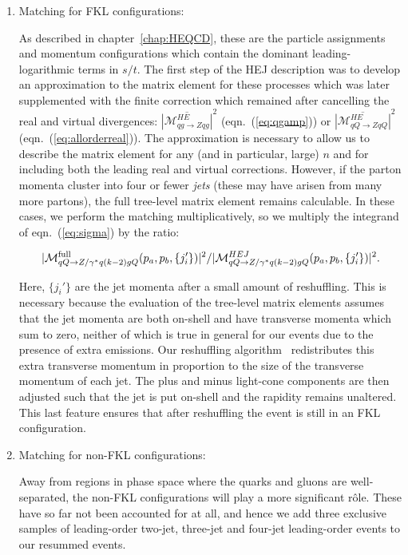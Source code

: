 	\begin{enumerate}
		\item Matching for FKL configurations:

		  As described in chapter~\ref{chap:HEQCD}, these are the particle assignments
		  and momentum configurations which contain the dominant leading-logarithmic
		  terms in $s/t$.  The first step of the HEJ description was to develop an
		  approximation to the matrix element for these processes which was later
		  supplemented with the finite correction which remained after cancelling the
		  real and virtual divergences: $\overline{|\mathcal{M}_{qg\to Zqg}^{HE}|}^2$
		  (eqn.~(\ref{eq:qgamp})) or $\overline{|\mathcal{M}_{qQ\to ZqQ}^{HE}|}^2$
		  (eqn.~(\ref{eq:allorderreal})).  The approximation is necessary to allow us to
		  describe the matrix element for any (and in particular, large) $n$ and for
		  including both the leading real and virtual corrections.  However,
		  if the parton momenta cluster into four or fewer \emph{jets} (these
		  may have arisen from many more partons), the full tree-level matrix element remains
		  calculable.  In these cases, we perform the matching multiplicatively, so we
		  multiply the integrand of eqn.~(\ref{eq:sigma}) by the ratio:

		  \begin{align}
		    |\mathcal{M}^{\rm full}_{qQ\to Z/\gamma^* q(k-2)gQ}(p_a,p_b,\{
		    j_i'\})|^2/|\mathcal{M}^{HEJ}_{qQ\to Z/\gamma^* q(k-2)gQ}(p_a,p_b,\{j_i'\})|^2.
		  \end{align}

		  Here, $\{j_i'\}$ are the jet momenta after a small amount of
		  reshuffling.  This is necessary because the evaluation of the tree-level matrix elements
		  assumes that the jet momenta are both on-shell and have transverse momenta which
		  sum to zero, neither of which is true in general for our events due to the
		  presence of extra emissions.  Our reshuffling algorithm~\cite{Andersen:2011hs} redistributes this
		  extra transverse momentum in proportion to the size of the transverse
		  momentum of each jet.  The plus and minus light-cone components are then adjusted such
		  that the jet is put on-shell and the rapidity remains unaltered.  This last
		  feature ensures that after reshuffling the event is still in an FKL
		  configuration.

		\item Matching for non-FKL configurations:

		  Away from regions in phase space where the quarks and gluons are
		  well-separated, the non-FKL configurations will play a more significant
		  r\^ole.  These have so far not been accounted for at all, and hence we add
		  three exclusive samples of leading-order two-jet, three-jet and four-jet
		  leading-order events to our resummed events.

	\end{enumerate}

